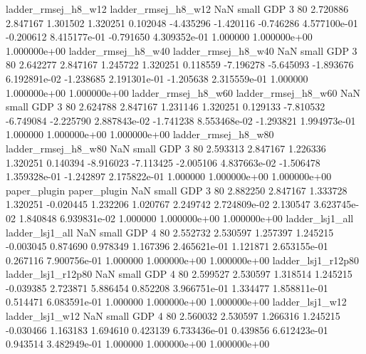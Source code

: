      ladder_rmsej_h8_w12      ladder_rmsej_h8_w12                   NaN      small      GDP                 3 80 2.720886       2.847167 1.301502       1.320251    0.102048     -4.435296     -1.420116    -0.746286   4.577100e-01 -0.200612 8.415177e-01    -0.791650   4.309352e-01            1.000000    1.000000e+00        1.000000e+00
     ladder_rmsej_h8_w40      ladder_rmsej_h8_w40                   NaN      small      GDP                 3 80 2.642277       2.847167 1.245722       1.320251    0.118559     -7.196278     -5.645093    -1.893676   6.192891e-02 -1.238685 2.191301e-01    -1.205638   2.315559e-01            1.000000    1.000000e+00        1.000000e+00
     ladder_rmsej_h8_w60      ladder_rmsej_h8_w60                   NaN      small      GDP                 3 80 2.624788       2.847167 1.231146       1.320251    0.129133     -7.810532     -6.749084    -2.225790   2.887843e-02 -1.741238 8.553468e-02    -1.293821   1.994973e-01            1.000000    1.000000e+00        1.000000e+00
     ladder_rmsej_h8_w80      ladder_rmsej_h8_w80                   NaN      small      GDP                 3 80 2.593313       2.847167 1.226336       1.320251    0.140394     -8.916023     -7.113425    -2.005106   4.837663e-02 -1.506478 1.359328e-01    -1.242897   2.175822e-01            1.000000    1.000000e+00        1.000000e+00
            paper_plugin             paper_plugin                   NaN      small      GDP                 3 80 2.882250       2.847167 1.333728       1.320251   -0.020445      1.232206      1.020767     2.249742   2.724809e-02  2.130547 3.623745e-02     1.840848   6.939831e-02            1.000000    1.000000e+00        1.000000e+00
         ladder_lsj1_all          ladder_lsj1_all                   NaN      small      GDP                 4 80 2.552732       2.530597 1.257397       1.245215   -0.003045      0.874690      0.978349     1.167396   2.465621e-01  1.121871 2.653155e-01     0.267116   7.900756e-01            1.000000    1.000000e+00        1.000000e+00
      ladder_lsj1_r12p80       ladder_lsj1_r12p80                   NaN      small      GDP                 4 80 2.599527       2.530597 1.318514       1.245215   -0.039385      2.723871      5.886454     0.852208   3.966751e-01  1.334477 1.858811e-01     0.514471   6.083591e-01            1.000000    1.000000e+00        1.000000e+00
         ladder_lsj1_w12          ladder_lsj1_w12                   NaN      small      GDP                 4 80 2.560032       2.530597 1.266316       1.245215   -0.030466      1.163183      1.694610     0.423139   6.733436e-01  0.439856 6.612423e-01     0.943514   3.482949e-01            1.000000    1.000000e+00        1.000000e+00
